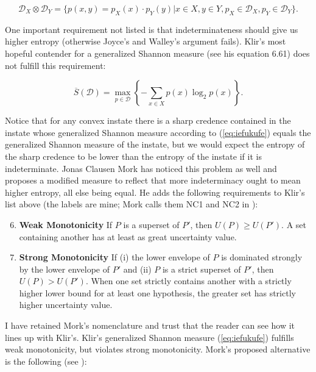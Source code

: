 \begin{equation}
  \label{eq:xoofahee}
\mathcal{D}_{X}\otimes\mathcal{D}_{Y}=\{p(x,y)=p_{X}(x)\cdot{}p_{Y}(y)|x\in{}X,y\in{}Y,p_{X}\in\mathcal{D}_{X},p_{Y}\in\mathcal{D}_{Y}\}.
\end{equation}

One important requirement not listed is that indeterminateness should
give us higher entropy (otherwise Joyce's and Walley's argument
fails). Klir's most hopeful contender for a generalized Shannon
measure (see his equation 6.61) does not fulfill this requirement:

\begin{equation}
  \label{eq:iefukufe}
\overline{S}(\mathcal{D})=\max_{p\in\mathcal{D}}\left\{-\sum_{x\in{}X}p(x)\log_{2}p(x)\right\}.
\end{equation}

Notice that for any convex instate there is a sharp credence contained
in the instate whose generalized Shannon measure according to
(\ref{eq:iefukufe}) equals the generalized Shannon measure of the
instate, but we would expect the entropy of the sharp credence to be
lower than the entropy of the instate if it is indeterminate. Jonas
Clausen Mork has noticed this problem as well and proposes a modified
measure to reflect that more indeterminacy ought to mean higher
entropy, all else being equal. He adds the following requirements to
Klir's list above (the labels are mine; Mork calls them NC1 and NC2 in
):

\begin{enumerate}[(S1)]
\setcounter{enumi}{5}
\item \textbf{Weak Monotonicity} If $P$ is a superset of $P'$, then
  $U(P)\geq{}U(P')$. A set containing another has at least as great
  uncertainty value.
\item \textbf{Strong Monotonicity} If (i) the lower envelope of $P$ is
  dominated strongly by the lower envelope of $P'$ and (ii) $P$ is a
  strict superset of $P'$, then $U(P)>U(P')$. When one set strictly
  contains another with a strictly higher lower bound for at least one
  hypothesis, the greater set has strictly higher uncertainty value.
\end{enumerate}

I have retained Mork's nomenclature and trust that the reader can see
how it lines up with Klir's. Klir's generalized Shannon measure
(\ref{eq:iefukufe}) fulfills weak monotonicity, but violates strong
monotonicity. Mork's proposed alternative is
the following (see ):

